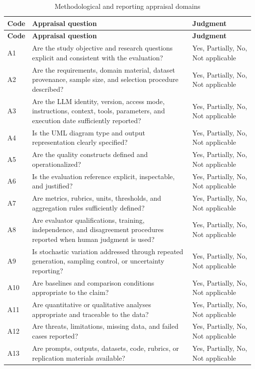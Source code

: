 \begin{longtable}{p{} p{} p{}}
\caption{Methodological and reporting appraisal domains}
\label{tab:protocol_appraisal}\\
\toprule
\textbf{Code} & \textbf{Appraisal question} & \textbf{Judgment} \\
\midrule
\endfirsthead
\toprule
\textbf{Code} & \textbf{Appraisal question} & \textbf{Judgment} \\
\midrule
\endhead
A1 & Are the study objective and research questions explicit and consistent with the evaluation? & Yes, Partially, No, Not applicable \\
A2 & Are the requirements, domain material, dataset provenance, sample size, and selection procedure described? & Yes, Partially, No, Not applicable \\
A3 & Are the LLM identity, version, access mode, instructions, context, tools, parameters, and execution date sufficiently reported? & Yes, Partially, No, Not applicable \\
A4 & Is the UML diagram type and output representation clearly specified? & Yes, Partially, No, Not applicable \\
A5 & Are the quality constructs defined and operationalized? & Yes, Partially, No, Not applicable \\
A6 & Is the evaluation reference explicit, inspectable, and justified? & Yes, Partially, No, Not applicable \\
A7 & Are metrics, rubrics, units, thresholds, and aggregation rules sufficiently defined? & Yes, Partially, No, Not applicable \\
A8 & Are evaluator qualifications, training, independence, and disagreement procedures reported when human judgment is used? & Yes, Partially, No, Not applicable \\
A9 & Is stochastic variation addressed through repeated generation, sampling control, or uncertainty reporting? & Yes, Partially, No, Not applicable \\
A10 & Are baselines and comparison conditions appropriate to the claim? & Yes, Partially, No, Not applicable \\
A11 & Are quantitative or qualitative analyses appropriate and traceable to the data? & Yes, Partially, No, Not applicable \\
A12 & Are threats, limitations, missing data, and failed cases reported? & Yes, Partially, No, Not applicable \\
A13 & Are prompts, outputs, datasets, code, rubrics, or replication materials available? & Yes, Partially, No, Not applicable \\
\bottomrule
\end{longtable}


